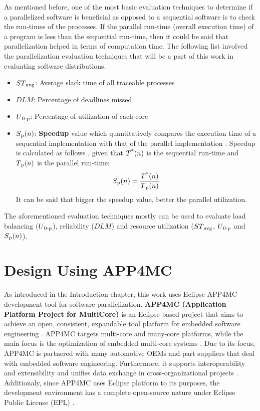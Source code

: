 As mentioned before, one of the most basic evaluation techniques to determine if a parallelized software is beneficial as opposed to a sequential software is to check the run-times of the processes. If the parallel run-time (overall execution time) of a program is less than the sequential run-time, then it could be said that parallelization helped in terms of computation time. The following list involved the parallelization evaluation techniques that will be a part of this work in evaluating software distributions.
\begin{itemize}
	\item ${ST\textsubscript{avg}}$: Average slack time of all traceable processes
	\item ${DLM}$: Percentage of deadlines missed
	\item ${U\textsubscript{0-p}}$: Percentage of utilization of each core
	\item ${S\textsubscript{p}(n)}$: \textbf{Speedup} value which quantitatively compares the execution time of a sequential implementation with that of the parallel implementation \cite{springerparallel}. Speedup is calculated as follows \cite{springerparallel}, given that ${T\textsuperscript{*}(n)}$ is the sequential run-time and ${T\textsubscript{p}(n)}$ is the parallel run-time:
	\begin{equation}\label{speedupeqn}
	S\textsubscript{p}(n)=\frac{T\textsuperscript{*}(n)}{T\textsubscript{p}(n)}
	\end{equation}
	It can be said that bigger the speedup value, better the parallel utilization.
\end{itemize}
The aforementioned evaluation techniques mostly can be used to evaluate load balancing (${U\textsubscript{0-p}}$), reliability (${DLM}$) and resource utilization (${ST\textsubscript{avg}}$, ${U\textsubscript{0-p}}$ and ${S\textsubscript{p}(n)}$). 

\section{Design Using APP4MC}
As introduced in the Introduction chapter, this work uses Eclipse APP4MC development tool for software parallelization. \textbf{APP4MC (Application Platform Project for MultiCore)} \cite{ICPDSSE} \cite{app4mcweb} is an Eclipse-based project that aims to achieve an open, consistent, expandable tool platform for embedded software engineering \cite{app4mchelp}. APP4MC targets multi-core and many-core platforms, while the main focus is the optimization of embedded multi-core systems \cite{app4mchelp}. Due to its focus, APP4MC is partnered with many automotive OEMs and part suppliers that deal with embedded software engineering.  Furthermore, it supports interoperability and extensibility and unifies data exchange in cross-organizational projects \cite{app4mcweb}. Additionaly, since APP4MC uses Eclipse platform to its purposes, the development environment has a complete open-source nature under Eclipse Public License (EPL) \cite{epl}. 

